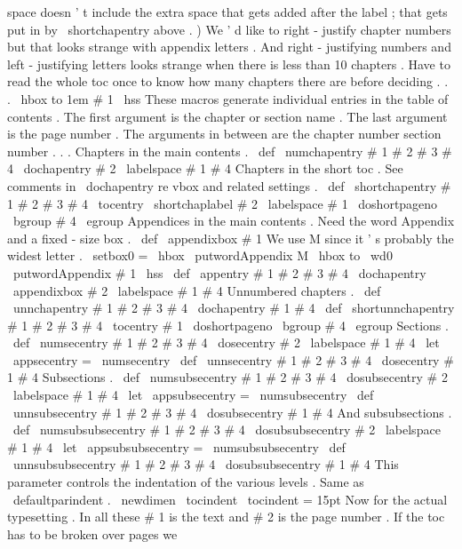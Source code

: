 {{{space
doesn
'
t
include
the
extra
space
that
gets
added
after
%
the
label
;
that
gets
put
in
by
\
shortchapentry
above
.
)
%
%
We
'
d
like
to
right
-
justify
chapter
numbers
but
that
looks
strange
%
with
appendix
letters
.
And
right
-
justifying
numbers
and
%
left
-
justifying
letters
looks
strange
when
there
is
less
than
10
%
chapters
.
Have
to
read
the
whole
toc
once
to
know
how
many
chapters
%
there
are
before
deciding
.
.
.
\
hbox
to
1em
{
#
1
\
hss
}
%
}
%
These
macros
generate
individual
entries
in
the
table
of
contents
.
%
The
first
argument
is
the
chapter
or
section
name
.
%
The
last
argument
is
the
page
number
.
%
The
arguments
in
between
are
the
chapter
number
section
number
.
.
.
%
Chapters
in
the
main
contents
.
\
def
\
numchapentry
#
1
#
2
#
3
#
4
{
\
dochapentry
{
#
2
\
labelspace
#
1
}
{
#
4
}
}
%
%
Chapters
in
the
short
toc
.
%
See
comments
in
\
dochapentry
re
vbox
and
related
settings
.
\
def
\
shortchapentry
#
1
#
2
#
3
#
4
{
%
\
tocentry
{
\
shortchaplabel
{
#
2
}
\
labelspace
#
1
}
{
\
doshortpageno
\
bgroup
#
4
\
egroup
}
%
}
%
Appendices
in
the
main
contents
.
%
Need
the
word
Appendix
and
a
fixed
-
size
box
.
%
\
def
\
appendixbox
#
1
{
%
%
We
use
M
since
it
'
s
probably
the
widest
letter
.
\
setbox0
=
\
hbox
{
\
putwordAppendix
{
}
M
}
%
\
hbox
to
\
wd0
{
\
putwordAppendix
{
}
#
1
\
hss
}
}
%
\
def
\
appentry
#
1
#
2
#
3
#
4
{
\
dochapentry
{
\
appendixbox
{
#
2
}
\
labelspace
#
1
}
{
#
4
}
}
%
Unnumbered
chapters
.
\
def
\
unnchapentry
#
1
#
2
#
3
#
4
{
\
dochapentry
{
#
1
}
{
#
4
}
}
\
def
\
shortunnchapentry
#
1
#
2
#
3
#
4
{
\
tocentry
{
#
1
}
{
\
doshortpageno
\
bgroup
#
4
\
egroup
}
}
%
Sections
.
\
def
\
numsecentry
#
1
#
2
#
3
#
4
{
\
dosecentry
{
#
2
\
labelspace
#
1
}
{
#
4
}
}
\
let
\
appsecentry
=
\
numsecentry
\
def
\
unnsecentry
#
1
#
2
#
3
#
4
{
\
dosecentry
{
#
1
}
{
#
4
}
}
%
Subsections
.
\
def
\
numsubsecentry
#
1
#
2
#
3
#
4
{
\
dosubsecentry
{
#
2
\
labelspace
#
1
}
{
#
4
}
}
\
let
\
appsubsecentry
=
\
numsubsecentry
\
def
\
unnsubsecentry
#
1
#
2
#
3
#
4
{
\
dosubsecentry
{
#
1
}
{
#
4
}
}
%
And
subsubsections
.
\
def
\
numsubsubsecentry
#
1
#
2
#
3
#
4
{
\
dosubsubsecentry
{
#
2
\
labelspace
#
1
}
{
#
4
}
}
\
let
\
appsubsubsecentry
=
\
numsubsubsecentry
\
def
\
unnsubsubsecentry
#
1
#
2
#
3
#
4
{
\
dosubsubsecentry
{
#
1
}
{
#
4
}
}
%
This
parameter
controls
the
indentation
of
the
various
levels
.
%
Same
as
\
defaultparindent
.
\
newdimen
\
tocindent
\
tocindent
=
15pt
%
Now
for
the
actual
typesetting
.
In
all
these
#
1
is
the
text
and
#
2
is
the
%
page
number
.
%
%
If
the
toc
has
to
be
broken
over
pages
we
}}

